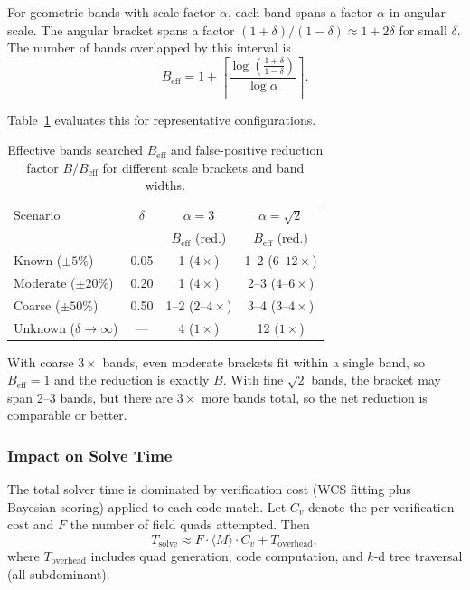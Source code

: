 \documentclass[twocolumn, 10pt]{article}
\begin{document}
For geometric bands with scale factor $\alpha$, each band spans a
factor $\alpha$ in angular scale. The angular bracket spans a factor
$(1 + \delta)/(1 - \delta) \approx 1 + 2\delta$ for small $\delta$.
The number of bands overlapped by this interval is
\begin{equation} \label{eq:beff}
    B_{\text{eff}} = 1 + \left\lceil
    \frac{\log\left(\frac{1+\delta}{1-\delta}\right)}
    {\log \alpha} \right\rceil.
\end{equation}

Table~\ref{tab:beff} evaluates this for representative configurations.

\begin{table}[t]
\centering
\caption{Effective bands searched $B_{\text{eff}}$ and false-positive
reduction factor $B/B_{\text{eff}}$ for different scale brackets and
band widths. \label{tab:beff}}
\small
\setlength{\tabcolsep}{4pt}
\begin{tabular}{@{}lccc@{}}
\toprule
Scenario & $\delta$ & \multicolumn{1}{c}{$\alpha = 3$} & \multicolumn{1}{c}{$\alpha = \sqrt{2}$} \\
         &          & $B_{\text{eff}}$ (red.) & $B_{\text{eff}}$ (red.) \\
\midrule
Known ($\pm 5\%$)           & 0.05 & 1 ($4\times$)         & 1--2 ($6$--$12\times$) \\
Moderate ($\pm 20\%$)       & 0.20 & 1 ($4\times$)         & 2--3 ($4$--$6\times$)  \\
Coarse ($\pm 50\%$)         & 0.50 & 1--2 ($2$--$4\times$) & 3--4 ($3$--$4\times$)  \\
Unknown ($\delta\to\infty$) & ---  & 4 ($1\times$)         & 12 ($1\times$)         \\
\bottomrule
\end{tabular}
\end{table}

With coarse $3\times$ bands, even moderate brackets fit within a
single band, so $B_{\text{eff}} = 1$ and the reduction is exactly $B$.
With fine $\sqrt{2}$ bands, the bracket may span 2--3 bands, but
there are $3\times$ more bands total, so the net reduction is
comparable or better.

\subsubsection{Impact on Solve Time}

The total solver time is dominated by verification cost (WCS fitting
plus Bayesian scoring) applied to each code match. Let $C_v$ denote
the per-verification cost and $F$ the number of field quads attempted.
Then
\begin{equation} \label{eq:tsolve}
    T_{\text{solve}} \approx F \cdot \langle M \rangle \cdot C_v
    + T_{\text{overhead}},
\end{equation}
where $T_{\text{overhead}}$ includes quad generation, code computation,
and $k$-d tree traversal (all subdominant).
\end{document}
